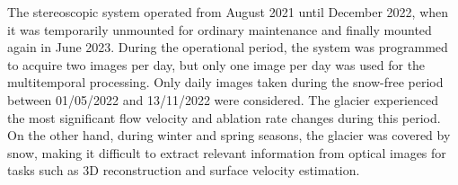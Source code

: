 


The stereoscopic system operated from August 2021 until December 2022, when it was temporarily unmounted for ordinary maintenance and finally mounted again in June 2023.
During the operational period, the system was programmed to acquire two images per day, but only one image per day was used for the multitemporal processing.
Only daily images taken during the snow-free period between 01/05/2022 and 13/11/2022 were considered.
The glacier experienced the most significant flow velocity and ablation rate changes during this period. 
On the other hand, during winter and spring seasons, the glacier was covered by snow, making it difficult to extract relevant information from optical images for tasks such as 3D reconstruction and surface velocity estimation.

